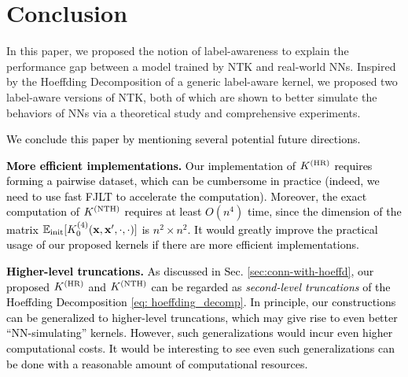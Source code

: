 \section{Conclusion}\label{sec:discussion}


In this paper, we proposed the notion of label-awareness to explain the performance gap between a model trained by NTK and real-world NNs. %
Inspired by the Hoeffding Decomposition of a generic label-aware kernel, we proposed two label-aware versions of NTK, both of which are shown to better simulate the behaviors of NNs via a theoretical study and comprehensive experiments. 

\textcolor{black}{We conclude this paper by mentioning several potential future directions.}


\textcolor{black}{{\bf More efficient implementations.} Our implementation of $K^{(\textnormal{HR})}$ requires forming a pairwise dataset, which can be cumbersome in practice (indeed, we need to use fast FJLT to accelerate the computation). Moreover, the exact computation of $K^{(\textnormal{NTH})}$ requires at least $O(n^4)$ time, since the dimension of the matrix ${\mathbb{E}}_{\textnormal{init}} [{K}^{(4)}_0({\mathbf{x}}, {\mathbf{x}}', \cdot, \cdot)]$ is $n^2\times n^2$. It would greatly improve the practical usage of our proposed kernels if there are more efficient implementations.}

\textcolor{black}{{\bf Higher-level truncations.} As discussed in Sec. \ref{sec:conn-with-hoeffd}, our proposed $K^{(\textnormal{HR})}$ and $K^{(\textnormal{NTH})}$ can be regarded as \emph{second-level truncations} of the Hoeffding Decomposition \eqref{eq: hoeffding_decomp}. In principle, our constructions can be generalized to higher-level truncations, which may give rise to even better ``NN-simulating'' kernels. However, such generalizations would incur even higher computational costs. It would be interesting to see even such generalizations can be done with a reasonable amount of computational resources.}

